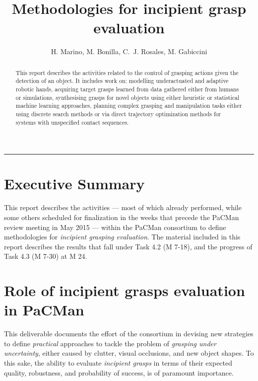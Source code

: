 \documentclass[a4paper,11pt,pdf]{pacmanreport}
\title{Methodologies for incipient grasp evaluation}
\author{H. Marino, M. Bonilla, C.~J. Rosales, M. Gabiccini}
\begin{document}
\maketitle

\begin{abstract}
\noindent This report describes the activities related to the control of grasping actions given the detection of an object. It includes work on: modelling underactuated and adaptive robotic hands, acquiring target grasps learned from data gathered either from humans or simulations, synthesising grasps for novel objects using either heuristic or statistical machine learning approaches, planning complex grasping and manipulation tasks either using discrete search methods or via direct trajectory optimization methods for systems with unspecified contact sequences.
\end{abstract}


\vspace{.2em}
\hrule

\footnotesize

\tableofcontents

\normalsize

\newpage

\section*{Executive Summary}

This report describes the activities --- most of which already performed, while some others scheduled for finalization in the weeks that precede the PaCMan review meeting in May 2015 --- within the PaCMan consortium to define methodologies for \emph{incipient grasping evaluation}. The material included in this report describes the results that fall under Task 4.2 (M 7-18), and the progress of Task 4.3 (M 7-30) at M 24.

\section*{Role of incipient grasps evaluation in PaCMan}

This deliverable documents the effort of the consortium in devising new strategies to define \emph{practical} approaches to tackle the problem of \emph{grasping under uncertainty}, either caused by clutter, visual occlusions, and new object shapes. To this sake, the ability to evaluate \emph{incipient grasps} in terms of their expected quality, robustness, and probability of success, is of paramount importance.
\end{document}
